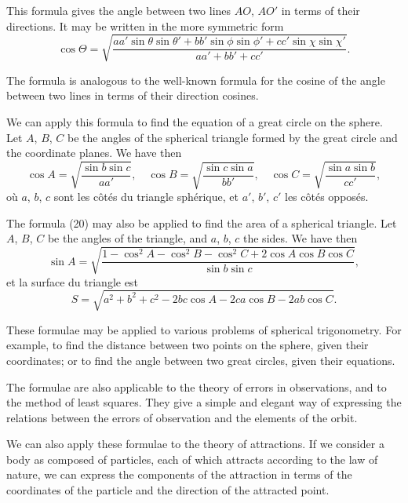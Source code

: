 \documentclass[11pt,a4paper]{book}
\begin{document}
\newpage
\setcounter{page}{220}

This formula gives the angle between two lines $AO$, $AO'$ in terms of their
directions. It may be written in the more symmetric form
\[
\cos\Theta = \sqrt{\frac{aa'\sin\theta \sin\theta' + bb'\sin\phi \sin\phi' + cc'\sin\chi \sin\chi'}{aa' + bb' + cc'}}.
\]

The formula is analogous to the well-known formula for the cosine of the angle
between two lines in terms of their direction cosines.

\newpage
\setcounter{page}{221}

We can apply this formula to find the equation of a great circle on the sphere.
Let $A$, $B$, $C$ be the angles of the spherical triangle formed by the great circle and
the coordinate planes. We have then
\[
\cos A = \sqrt{\frac{\sin b \sin c}{aa'}}, \quad \cos B = \sqrt{\frac{\sin c \sin a}{bb'}}, \quad \cos C = \sqrt{\frac{\sin a \sin b}{cc'}},
\]
o\`{u} $a$, $b$, $c$ sont les c\^{o}t\'{e}s du triangle sph\'{e}rique, et $a'$, $b'$, $c'$ les c\^{o}t\'{e}s oppos\'{e}s.

\newpage
\setcounter{page}{222}

The formula (20) may also be applied to find the area of a spherical triangle.
Let $A$, $B$, $C$ be the angles of the triangle, and $a$, $b$, $c$ the sides. We have then
\[
\sin A = \sqrt{\frac{1 - \cos^2 A - \cos^2 B - \cos^2 C + 2\cos A \cos B \cos C}{\sin b \sin c}},
\]
et la surface du triangle est
\[
S = \sqrt{a^2 + b^2 + c^2 - 2bc\cos A - 2ca\cos B - 2ab\cos C}.
\]

\newpage
\setcounter{page}{223}

These formulae may be applied to various problems of spherical trigonometry.
For example, to find the distance between two points on the sphere, given their
coordinates; or to find the angle between two great circles, given their equations.

The formulae are also applicable to the theory of errors in observations, and to
the method of least squares. They give a simple and elegant way of expressing the
relations between the errors of observation and the elements of the orbit.

\newpage
\setcounter{page}{224}

We can also apply these formulae to the theory of attractions. If we consider a
body as composed of particles, each of which attracts according to the law of nature,
we can express the components of the attraction in terms of the coordinates of the
particle and the direction of the attracted point.
\end{document}
